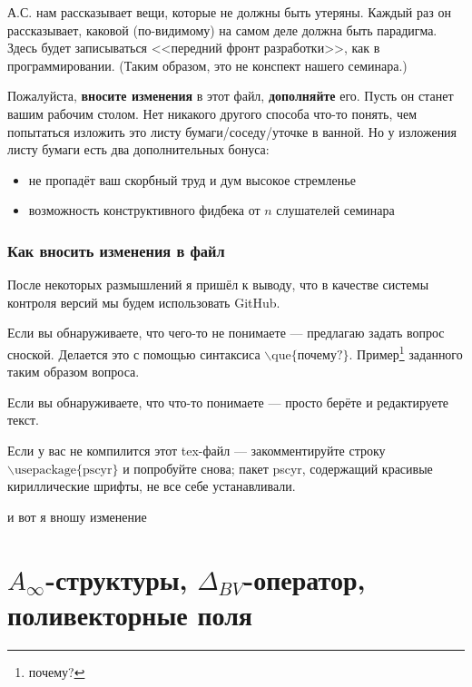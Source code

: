 \documentclass[11pt]{article}
\theoremstyle{remark}
\theoremstyle{definition}
\newcommand{\que}[1]{\footnote{\textcolor[rgb]{0.38,0.69,0.82}{#1}}}
\begin{document}
\baselineskip14pt
\bigskip


\tableofcontents
\bigskip
\bigskip


А.С. нам рассказывает вещи, которые не должны быть утеряны. Каждый раз он рассказывает, каковой (по-видимому) на самом деле должна быть парадигма. Здесь будет записываться <<передний фронт разработки>>, как в программировании. (Таким образом, это не конспект нашего семинара.)

Пожалуйста, \textbf{вносите изменения} в этот файл, \textbf{дополняйте} его. Пусть он станет вашим рабочим столом. Нет никакого другого способа что-то понять, чем попытаться изложить это листу бумаги/соседу/уточке в ванной. Но у изложения листу бумаги есть два дополнительных бонуса:
\begin{itemize}
  \item не пропадёт ваш скорбный труд и дум высокое стремленье
  \item возможность конструктивного фидбека от $n$ слушателей семинара
\end{itemize}

\subsubsection{Как вносить изменения в файл}

После некоторых размышлений я пришёл к выводу, что в качестве системы контроля версий мы будем использовать GitHub.

Если вы обнаруживаете, что чего-то не понимаете --- предлагаю задать вопрос сноской. Делается это с помощью синтаксиса $\backslash \text{que} \{ \text{почему?} \}$. Пример\que{почему?} заданного таким образом вопроса.

Если вы обнаруживаете, что что-то понимаете --- просто берёте и редактируете текст.

Если у вас не компилится этот tex-файл --- закомментируйте строку $\backslash\text{usepackage}\{ \text{pscyr} \}$ и попробуйте снова; пакет pscyr, содержащий красивые кириллические шрифты, не все себе устанавливали.

и вот я вношу изменение

\newpage




\section{$A_{\infty}$-структуры, $\Delta_{BV}$-оператор, поливекторные поля}
\end{document}
